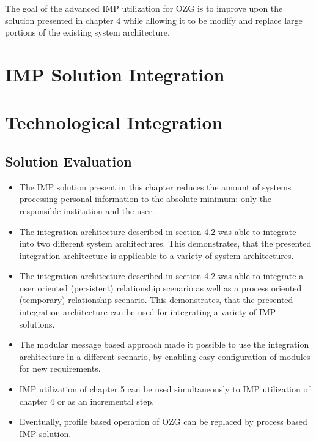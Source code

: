 
The goal of the advanced IMP utilization for OZG is to improve upon the solution presented in chapter 4 while allowing it to be modify and replace large portions of the existing system architecture. 

\section{IMP Solution Integration}



\section{Technological Integration}



\subsection{Solution Evaluation}

\begin{itemize}

    \item The IMP solution present in this chapter reduces the amount of systems processing personal information to the absolute minimum: only the responsible institution and the user.
    
    \item The integration architecture described in section 4.2 was able to integrate into two different system architectures. This demonstrates, that the presented integration architecture is applicable to a variety of system architectures.
    
    \item The integration architecture described in section 4.2 was able to integrate a user oriented (persistent) relationship scenario as well as a process oriented (temporary) relationship scenario. This demonstrates, that the presented integration architecture can be used for integrating a variety of IMP solutions.
    
    \item The modular message based approach made it possible to use the integration architecture in a different scenario, by enabling easy configuration of modules for new requirements.
    
    \item IMP utilization of chapter 5 can be used simultaneously to IMP utilization of chapter 4 or as an incremental step.
    
    \item Eventually, profile based operation of OZG can be replaced by process based IMP solution.
    
\end{itemize}

